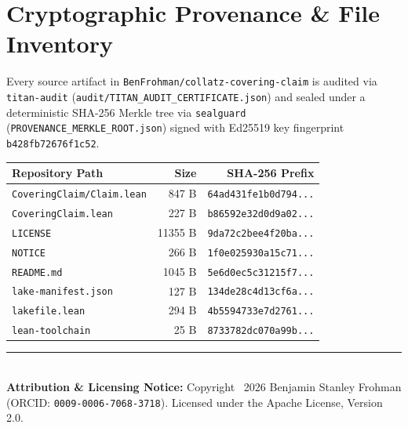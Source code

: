 \documentclass[11pt,a4paper]{article}
\begin{document}
\section{Cryptographic Provenance \& File Inventory}
Every source artifact in \texttt{BenFrohman/collatz-covering-claim} is audited via \texttt{titan-audit}
(\texttt{audit/TITAN\_AUDIT\_CERTIFICATE.json}) and sealed under a deterministic SHA-256 Merkle tree via
\texttt{sealguard} (\texttt{PROVENANCE\_MERKLE\_ROOT.json}) signed with Ed25519 key fingerprint
\texttt{b428fb72676f1c52}.

\begin{center}
\small
\begin{tabular}{p{}rr}
\toprule
\textbf{Repository Path} & \textbf{Size} & \textbf{SHA-256 Prefix} \\
\midrule
\texttt{CoveringClaim/Claim.lean} & 847 B & \texttt{64ad431fe1b0d794...} \\
\texttt{CoveringClaim.lean} & 227 B & \texttt{b86592e32d0d9a02...} \\
\texttt{LICENSE} & 11355 B & \texttt{9da72c2bee4f20ba...} \\
\texttt{NOTICE} & 266 B & \texttt{1f0e025930a15c71...} \\
\texttt{README.md} & 1045 B & \texttt{5e6d0ec5c31215f7...} \\
\texttt{lake-manifest.json} & 127 B & \texttt{134de28c4d13cf6a...} \\
\texttt{lakefile.lean} & 294 B & \texttt{4b5594733e7d2761...} \\
\texttt{lean-toolchain} & 25 B & \texttt{8733782dc070a99b...} \\
\bottomrule
\end{tabular}
\end{center}

\vfill
\noindent\rule{\textwidth}{0.4pt}\\
\footnotesize
\textbf{Attribution \& Licensing Notice:} Copyright \textcopyright\ 2026 Benjamin Stanley Frohman (ORCID: \texttt{0009-0006-7068-3718}).
Licensed under the Apache License, Version 2.0.
\end{document}
